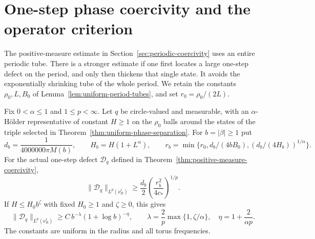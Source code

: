\section{One-step phase coercivity and the operator criterion}
\label{sec:operator-bridge}
The positive-measure estimate in Section~\ref{sec:periodic-coercivity}
uses an entire periodic tube. There is a stronger estimate if one first
locates a large one-step defect on the period, and only then thickens
that single state. It avoids the exponentially shrinking tube of the
whole period. We retain the constants $\rho_0,L,B_0$ of
Lemma~\ref{lem:uniform-period-tubes}, and set $r_0=\rho_0/(2L)$.

\begin{theorem}
\label{thm:one-step-coercivity}
Fix $0<\alpha\le1$ and $1\le p<\infty$. Let $q$ be circle-valued and
measurable, with an $\alpha$-H\"older representative of constant $H\ge1$
on the $\rho_0$ balls around the states of the triple selected in
Theorem~\ref{thm:uniform-phase-separation}. For $b=|\beta|\ge1$ put
\[
 d_b=\frac1{4000000\pi M(b)},\qquad
 H_b=H(1+L^\alpha),\qquad
 r_b=\min\{r_0,d_b/(4bB_0),(d_b/(4H_b))^{1/\alpha}\}.
\]
For the actual one-step defect $\mathcal D_q$ defined in
Theorem~\ref{thm:positive-measure-coercivity},
\begin{equation}\label{eq:one-step-coercivity}
 \|\mathcal D_q\|_{L^p(\nu_R^*)}
       \ge\frac{d_b}{2}\left(\frac{r_b^2}{4c_*}\right)^{1/p}.
\end{equation}
If $H\le H_0b^\zeta$ with fixed $H_0\ge1$ and $\zeta\ge0$, this gives
\begin{equation}\label{eq:sharper-phase-power}
 \|\mathcal D_q\|_{L^p(\nu_R^*)}
 \ge C\,b^{-\lambda}(1+\log b)^{-\eta},\qquad
 \lambda=\frac2p\max\{1,\zeta/\alpha\},\quad
 \eta=1+\frac2{\alpha p}.
\end{equation}
The constants are uniform in the radius and all torus frequencies.
\end{theorem}
